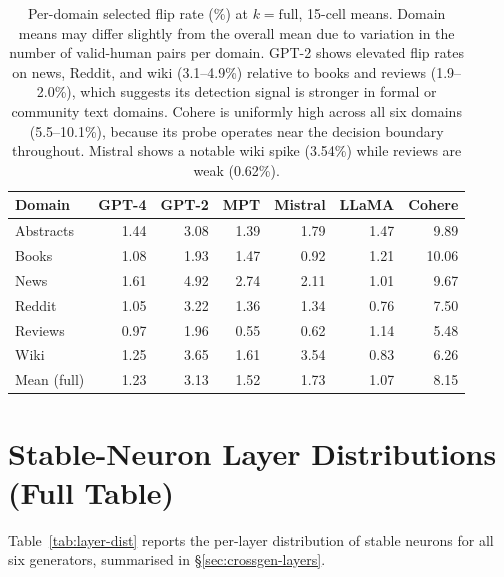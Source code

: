 \documentclass[11pt]{article}
\begin{document}
\begin{table}[!htbp]
\centering
\small
\begin{tabular}{lrrrrrr}
\toprule
Domain & GPT-4 & GPT-2 & MPT & Mistral & LLaMA & Cohere \\
\midrule
Abstracts & 1.44 & 3.08 & 1.39 & 1.79 & 1.47 &  9.89 \\
Books     & 1.08 & 1.93 & 1.47 & 0.92 & 1.21 & 10.06 \\
News      & 1.61 & 4.92 & 2.74 & 2.11 & 1.01 &  9.67 \\
Reddit    & 1.05 & 3.22 & 1.36 & 1.34 & 0.76 &  7.50 \\
Reviews   & 0.97 & 1.96 & 0.55 & 0.62 & 1.14 &  5.48 \\
Wiki      & 1.25 & 3.65 & 1.61 & 3.54 & 0.83 &  6.26 \\
\midrule
Mean (full) & 1.23 & 3.13 & 1.52 & 1.73 & 1.07 & 8.15 \\
\bottomrule
\end{tabular}
\caption{Per-domain selected flip rate (\%) at $k = \text{full}$, 15-cell means. Domain means may differ slightly from the overall mean due to variation in the number of valid-human pairs per domain. GPT-2 shows elevated flip rates on news, Reddit, and wiki (3.1--4.9\%) relative to books and reviews (1.9--2.0\%), which suggests its detection signal is stronger in formal or community text domains. Cohere is uniformly high across all six domains (5.5--10.1\%), because its probe operates near the decision boundary throughout. Mistral shows a notable wiki spike (3.54\%) while reviews are weak (0.62\%).}
\label{tab:perdomain}
\end{table}

\section{Stable-Neuron Layer Distributions (Full Table)}
\label{app:layer-dist}

Table~\ref{tab:layer-dist} reports the per-layer distribution of stable neurons for all six generators, summarised in §\ref{sec:crossgen-layers}.
\end{document}
